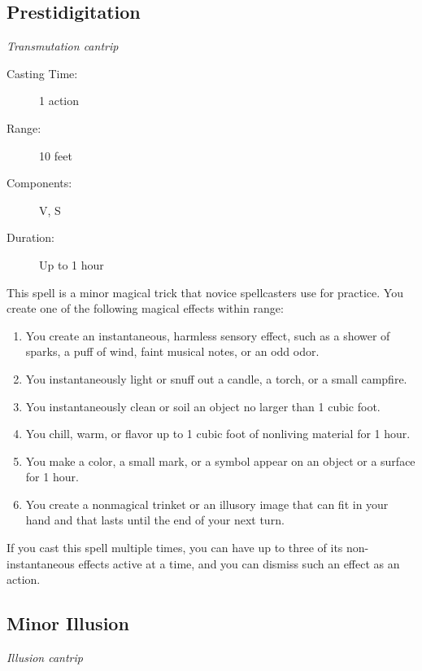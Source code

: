 \documentclass[letterpaper,10pt,twoside,twocolumn,openany]{book}
\begin{document}
\subsection{Prestidigitation} \hypertarget{Prestidigitation}{}
\begin{hangingpar}
	\textit{Transmutation cantrip}
\end{hangingpar}

\begin{description}
	\item[Casting Time:] 1 action 
	\item[Range:] 10 feet 
	\item[Components:] V, S 
	\item[Duration:] Up to 1 hour 
\end{description}

This spell is a minor magical trick that novice spellcasters use for practice. You create one of the following magical effects within range:

\begin{enumerate}
	\item You create an instantaneous, harmless sensory effect, such as a shower of sparks, a puff of wind, faint musical notes, or an odd odor.
	\item You instantaneously light or snuff out a candle, a torch, or a small campfire.
	\item You instantaneously clean or soil an object no larger than 1 cubic foot.
	\item You chill, warm, or flavor up to 1 cubic foot of nonliving material for 1 hour.
	\item You make a color, a small mark, or a symbol appear on an object or a surface for 1 hour.
	\item You create a nonmagical trinket or an illusory image that can fit in your hand and that lasts until the end of your next turn.
\end{enumerate}

If you cast this spell multiple times, you can have up to three of its non-instantaneous effects active at a time, and you can dismiss such an effect as an action. 

\subsection{Minor Illusion} \hypertarget{Minor Illusiont}{}
\begin{hangingpar}
	\textit{Illusion cantrip}
\end{hangingpar}
\end{document}
